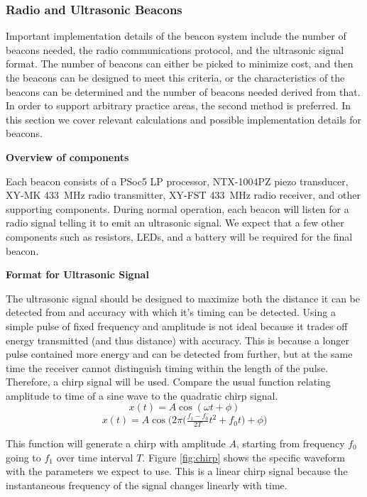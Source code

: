 \documentclass{article}
\begin{document}
    \subsubsection{Radio and Ultrasonic Beacons}

      Important implementation details of the beacon system include the number of beacons needed, the radio communications protocol, and the ultrasonic signal format. The number of beacons can either be picked to minimize cost, and then the beacons can be designed to meet this criteria, or the characteristics of the beacons can be determined and the number of beacons needed derived from that. In order to support arbitrary practice areas, the second method is preferred. In this section we cover relevant calculations and possible implementation details for beacons.

      \textbf{Overview of components}

      Each beacon consists of a PSoc5 LP processor, NTX-1004PZ piezo transducer, XY-MK \SI{433}{\mega\hertz} radio transmitter, XY-FST \SI{433}{\mega\hertz} radio receiver, and other supporting components. During normal operation, each beacon will listen for a radio signal telling it to emit an ultrasonic signal. We expect that a few other components such as resistors, LEDs, and a battery will be required for the final beacon.

      \textbf{Format for Ultrasonic Signal}

      The ultrasonic signal should be designed to maximize both the distance it can be detected from and accuracy with which it's timing can be detected. Using a simple pulse of fixed frequency and amplitude is not ideal because it trades off energy transmitted (and thus distance) with accuracy. This is because a longer pulse contained more energy and can be detected from further, but at the same time the receiver cannot distinguish timing within the length of the pulse. Therefore, a chirp signal will be used. Compare the usual function relating amplitude to time of a sine wave to the quadratic chirp signal.
      $$ x(t) = A\cos(\omega t + \phi) $$
      $$ x(t) = A\cos\bigg(2\pi\Big(\tfrac{f_1 - f_0}{2T}t^2+f_0t\Big) + \phi\bigg) $$

      This function will generate a chirp with amplitude $A$, starting from frequency $f_0$ going to $f_1$ over time interval $T$. Figure \ref{fig:chirp} shows the specific waveform with the parameters we expect to use. This is a linear chirp signal because the instantaneous frequency of the signal changes linearly with time.
\end{document}
